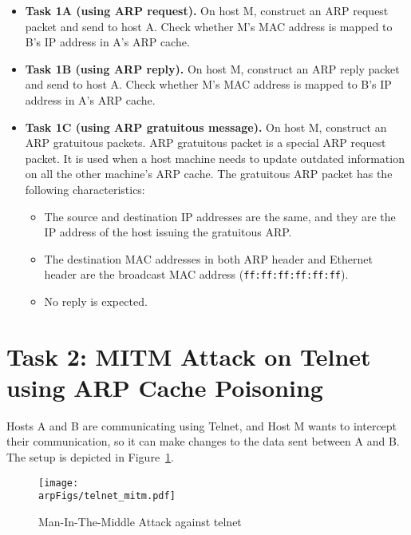 \begin{itemize}
\item \textbf{Task 1A (using ARP request).} On host M, construct an ARP request packet and send
to host A. Check whether M's MAC address is mapped to B's IP address in A's ARP cache.
    
\item \textbf{Task 1B (using ARP reply).} On host M, construct an ARP reply packet and send to
host A. Check whether M's MAC address is mapped to B's IP address in A's ARP cache.
    
\item \textbf{Task 1C (using ARP gratuitous message).} On host M, construct an ARP gratuitous
packets. ARP gratuitous packet is a special ARP request packet. It is used when a host machine
needs to update outdated information on all the other machine's ARP cache. The gratuitous ARP
packet has the following characteristics:

\begin{itemize}
\item The source and destination IP addresses are the same, and they are the IP address of the
host issuing the gratuitous ARP.

\item The destination MAC addresses in both ARP header and Ethernet header are the broadcast
MAC address ({\tt ff:ff:ff:ff:ff:ff}).

\item No reply is expected.
\end{itemize}
\end{itemize}



\section{Task 2: MITM Attack on Telnet using ARP Cache Poisoning}

Hosts A and B are communicating using Telnet, and Host M wants to intercept their
communication, so it can make changes to the data sent between A and B. The setup is depicted
in Figure~\ref{arp:fig:telnet_mitm}. 

\begin{figure}
    \centering
    \texttt{[image: \\arpFigs/telnet\_mitm.pdf]}
    \caption{Man-In-The-Middle Attack against telnet}
    \label{arp:fig:telnet_mitm}
\end{figure}


